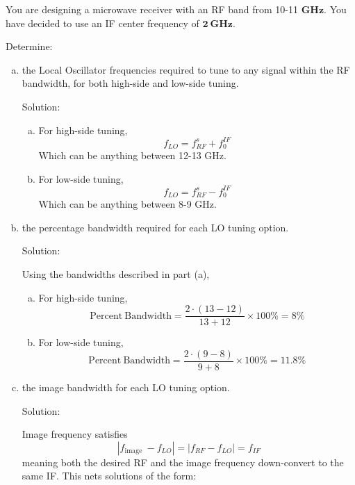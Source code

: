 \begin{homeworkProblem}
You are designing a microwave receiver with an RF band from 10-11 $\mathbf{G H z}$. You have decided to use an IF center frequency of $\mathbf{2 ~ G H z}$.

Determine:
\begin{enumerate}[a)]
    \item the Local Oscillator frequencies required to tune to any signal within the RF bandwidth, for both high-side and low-side tuning.
        \begin{callout}{Solution:}

        \begin{enumerate}[(a)]
            \item For high-side tuning, 
                $$f_{LO} = f_{RF}^s+f_{0}^{IF}$$
                Which can be anything between 12-13 GHz.

            \item For low-side tuning,
                $$f_{LO} = f_{RF}^s-f_{0}^{IF}$$
                Which can be anything between 8-9 GHz.
        \end{enumerate}

        \end{callout}
    \item the percentage bandwidth required for each LO tuning option.
        \begin{callout}{Solution:}

        Using the bandwidths described in part (a), 
        \begin{enumerate}[(a)]
            \item For high-side tuning,
                $$\mathrm{Percent~Bandwidth} = \frac{2 \cdot (13-12)}{13+12}\times100\% = 8\%$$

            \item For low-side tuning,
                $$\mathrm{Percent~Bandwidth} = \frac{2 \cdot (9-8)}{9+8}\times100\% = 11.8\%$$
        \end{enumerate}

        \end{callout}
    \item the image bandwidth for each LO tuning option.
        \begin{callout}{Solution:}

        Image frequency satisfies 
        $$\left|f_{\text {image }}-f_{L O}\right|=\left|f_{R F}-f_{L O}\right|=f_{I F}$$
        meaning both the desired RF and the image frequency down-convert to the same IF. This nets solutions of the form:


\end{callout}
\end{enumerate}
\end{homeworkProblem}
